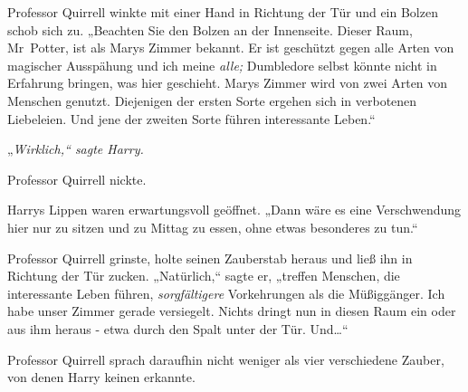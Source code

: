 Professor Quirrell winkte mit einer Hand in Richtung der Tür und ein Bolzen schob sich zu. „Beachten Sie den Bolzen an der Innenseite. Dieser Raum, Mr~Potter, ist als Marys Zimmer bekannt. Er ist geschützt gegen alle Arten von magischer Ausspähung und ich meine \emph{alle;} Dumbledore selbst könnte nicht in Erfahrung bringen, was hier geschieht. Marys Zimmer wird von zwei Arten von Menschen genutzt. Diejenigen der ersten Sorte ergehen sich in verbotenen Liebeleien. Und jene der zweiten Sorte führen interessante Leben.“

„\emph{Wirklich,“ sagte Harry.}

Professor Quirrell nickte.

Harrys Lippen waren erwartungsvoll geöffnet. „Dann wäre es eine Verschwendung hier nur zu sitzen und zu Mittag zu essen, ohne etwas besonderes zu tun.“

Professor Quirrell grinste, holte seinen Zauberstab heraus und ließ ihn in Richtung der Tür zucken. „Natürlich,“ sagte er, „treffen Menschen, die interessante Leben führen, \emph{sorgfältigere} Vorkehrungen als die Müßiggänger. Ich habe unser Zimmer gerade versiegelt. Nichts dringt nun in diesen Raum ein oder aus ihm heraus - etwa durch den Spalt unter der Tür. Und…“

Professor Quirrell sprach daraufhin nicht weniger als vier verschiedene Zauber, von denen Harry keinen erkannte.

